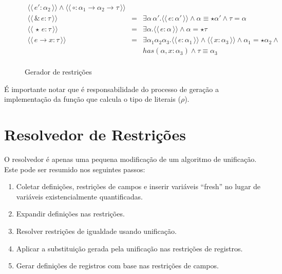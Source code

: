 \documentclass[a4paper,8pt]{article}
\newcommand{\constr}[1]{\ensuremath{\langle\langle\,#1\,\rangle\rangle}}
\begin{document}
\begin{figure}[h]
\[{\begin{array}{lcl}
                                                      \constr{e' :
                                                      \alpha_2} \land
                                                      \constr{\circ :
                                                      \alpha_1\to\alpha_2\to\tau}\\
                     \constr{\&\,e : \tau} & = & \exists \alpha\,
                                                 \alpha'. \constr{e :
                                                 \alpha'} \land
                                                 \alpha \equiv \star \alpha'
                                                 \land \tau = \alpha\\
                     \constr{\star\,e : \tau} & = & \exists
                                                    \alpha. \constr{e
                                                    : \alpha} \land
                                                    \alpha = \star \tau\\
                     \constr{e\to x : \tau} & = & \exists
                                                  \alpha_1\alpha_2\alpha_3. \constr{e
                                                  :\alpha_1} \land
                                                  \constr{x :
                                                  \alpha_3} \land
                                                  \alpha_1 = \star\alpha_2
                                                  \land\\
                          & & has(\alpha,x : \alpha_3) \land \tau
                              \equiv \alpha_3\\
            \end{array}}
       \]
       \centering
       \caption{Gerador de restrições}
       \label{figgen}
     \end{figure}

     É importante notar que é responsabilidade
     do processo de geração a implementação da função que calcula o
     tipo de literais ($\rho$).

     \section{Resolvedor de Restrições}\label{constraintsolver}

     O resolvedor é apenas uma pequena modificação de um algoritmo de
     unificação. Este pode ser resumido nos seguintes passos:
     \begin{enumerate}
          \item Coletar definições, restrições de campos e inserir
            variáveis ``fresh'' no lugar de variáveis existencialmente
            quantificadas.
          \item Expandir definições nas restrições.
          \item Resolver restrições de igualdade usando unificação.
          \item Aplicar a substituição gerada pela unificação nas
            restrições de registros.
          \item Gerar definições de registros com base nas restrições
            de campos.
     \end{enumerate}
\end{document}

